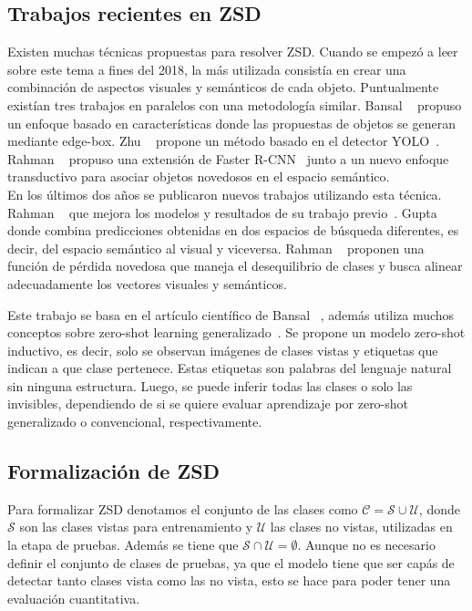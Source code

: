 \subsection{Trabajos recientes en ZSD} \label{ssec:trabajosrecientesenzsd}

Existen muchas técnicas propuestas para resolver ZSD. Cuando se empezó a leer sobre este tema a fines del 2018, la más utilizada consistía en crear una combinación de aspectos visuales y semánticos de cada objeto. Puntualmente existían tres trabajos en paralelos con una metodología similar. Bansal \etal~\cite{bansal2018zero} propuso un enfoque basado en características donde las propuestas de objetos se generan mediante edge-box. Zhu \etal~\cite{zhu2018zero} propone un método basado en el detector YOLO~\cite{redmon2016you}. Rahman \etal~\cite{rahman2018zero} propuso una extensión de Faster R-CNN~\cite{ren2015faster} junto a un nuevo enfoque transductivo para asociar objetos novedosos en el espacio semántico.\\

En los últimos dos años se publicaron nuevos trabajos utilizando esta técnica. Rahman \etal~\cite{rahman2020zero} que mejora los modelos y resultados de su trabajo previo~\cite{rahman2018zero}. Gupta \etal~\cite{gupta2020multi} donde combina predicciones obtenidas en dos espacios de búsqueda diferentes, es decir, del espacio semántico al visual y viceversa. Rahman \etal~\cite{rahman2020improved} proponen  una función de pérdida novedosa que maneja el desequilibrio de clases y busca alinear adecuadamente los vectores visuales y semánticos.

Este trabajo se basa en el artículo científico de Bansal \etal ~\cite{bansal2018zero}, además utiliza muchos conceptos sobre zero-shot learning generalizado~\cite{zero-shot-generalizado}. Se propone un modelo zero-shot  inductivo, es decir, solo se observan imágenes de clases vistas y etiquetas que indican a que clase pertenece. Estas etiquetas son palabras del lenguaje natural sin ninguna estructura. Luego, se puede inferir todas las clases o solo las invisibles, dependiendo de si se quiere evaluar aprendizaje por zero-shot  generalizado o convencional, respectivamente.\\ 

\subsection{Formalización de ZSD} \label{ssec:formalizaciondezsd}
Para formalizar ZSD denotamos el conjunto de las clases como $\mathcal{C} = \mathcal{S} \cup \mathcal{U}$, donde $\mathcal{S}$ son las clases vistas para entrenamiento y $\mathcal{U}$ las clases no vistas, utilizadas en la etapa de pruebas. Además se tiene que $\mathcal{S} \cap \mathcal{U} = \emptyset$. Aunque no es necesario definir el conjunto de clases de pruebas, ya que el modelo tiene que ser capás de detectar tanto clases vista como las no vista, esto se hace para poder tener una evaluación cuantitativa.

